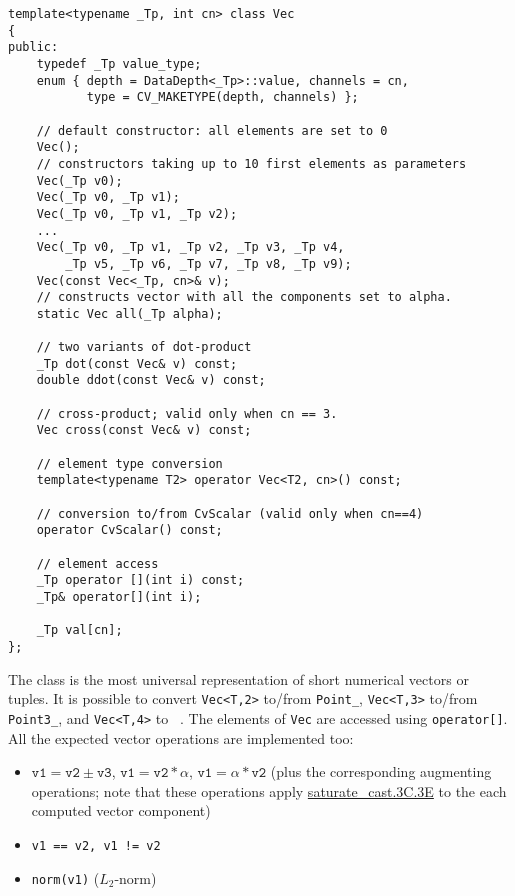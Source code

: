 \begin{lstlisting}
template<typename _Tp, int cn> class Vec
{
public:
    typedef _Tp value_type;
    enum { depth = DataDepth<_Tp>::value, channels = cn,
           type = CV_MAKETYPE(depth, channels) };
    
    // default constructor: all elements are set to 0
    Vec();
    // constructors taking up to 10 first elements as parameters
    Vec(_Tp v0);
    Vec(_Tp v0, _Tp v1);
    Vec(_Tp v0, _Tp v1, _Tp v2);
    ...
    Vec(_Tp v0, _Tp v1, _Tp v2, _Tp v3, _Tp v4,
        _Tp v5, _Tp v6, _Tp v7, _Tp v8, _Tp v9);
    Vec(const Vec<_Tp, cn>& v);
    // constructs vector with all the components set to alpha.
    static Vec all(_Tp alpha);
    
    // two variants of dot-product
    _Tp dot(const Vec& v) const;
    double ddot(const Vec& v) const;
    
    // cross-product; valid only when cn == 3.
    Vec cross(const Vec& v) const;
    
    // element type conversion
    template<typename T2> operator Vec<T2, cn>() const;
    
    // conversion to/from CvScalar (valid only when cn==4)
    operator CvScalar() const;
    
    // element access
    _Tp operator [](int i) const;
    _Tp& operator[](int i);

    _Tp val[cn];
};
\end{lstlisting}

The class is the most universal representation of short numerical vectors or tuples. It is possible to convert \texttt{Vec<T,2>} to/from \texttt{Point\_}, \texttt{Vec<T,3>} to/from \texttt{Point3\_}, and \texttt{Vec<T,4>} to ~. The elements of \texttt{Vec} are accessed using \texttt{operator[]}. All the expected vector operations are implemented too:

\begin{itemize}
    \item $\texttt{v1} = \texttt{v2} \pm \texttt{v3}$, $\texttt{v1} = \texttt{v2} * \alpha$, $\texttt{v1} = \alpha * \texttt{v2}$ (plus the corresponding augmenting operations; note that these operations apply \hyperref[saturatecast]{saturate\_cast.3C.3E} to the each computed vector component)
    \item \texttt{v1 == v2, v1 != v2}
    \item \texttt{norm(v1)} ($L_2$-norm)
\end{itemize}

